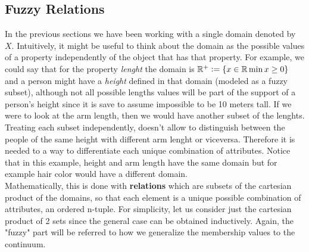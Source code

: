 

\begin{example}
\end{example}

\subsection{Fuzzy Relations}

In the previous sections we have been working with a single domain denoted by $X$. Intuitively, it might be useful to think about the domain as the possible values of a property independently of the object that has that property. For example, we could say that for the property \textit{lenght} the domain is $\mathbb{R}^+\mathrel{\mathop:}=
\{x\in\mathbb{R} \min x \geq 0\}$ and a person might have a \textit{height} defined in that domain (modeled as a fuzzy subset), although not all possible lengths values will be part of the support of a person's height since it is save to assume impossible to be 10 meters tall. If we were to look at the arm length, then we would have another subset of the lenghts. Treating each subset independently, doesn't allow to distinguish between the people of the same height with different arm lenght or viceversa. Therefore it is needed to a way to differentiate each unique combination of attributes. Notice that in this example, height and arm length have the same domain but for example hair color would have a different domain.\\

Mathematically, this is done with \textbf{relations} which are subsets of the cartesian product of the domains, so that each element is a unique possible combination of attributes, an ordered n-tuple. For simplicity, let us consider just the cartesian product of 2 sets since the general case can be obtained inductively. Again, the "fuzzy" part will be referred to how we generalize the membership values to the continuum.\\


